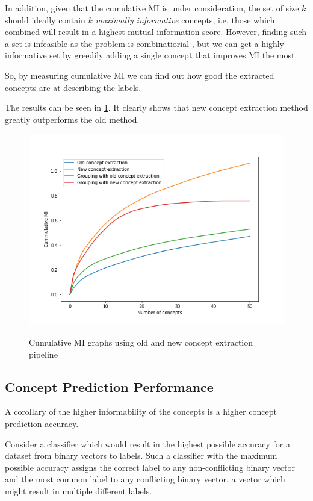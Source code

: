 In addition, given that the cumulative MI is under consideration, the set of size $k$ should ideally contain $k$ \emph{maximally informative} concepts, i.e. those which combined will result in a highest mutual information score.
However, finding such a set is infeasible as the problem is combinatiorial \cite{RefWorks:RefID:16-2021automatic}, but we can get a highly informative set by greedily adding a single concept that improves MI the most. 

So, by measuring cumulative MI we can find out how good the extracted concepts are at describing the labels.

The results can be seen in \ref{cummulative-mi-graphs}.
It clearly shows that new concept extraction method greatly outperforms the old method.

\begin{figure}[h]
\caption{Cumulative MI graphs using old and new concept extraction pipeline}
\centering
\includegraphics[width=\textwidth]{evaluation/Cummulative MI graphs.png}
\label{cummulative-mi-graphs}
\end{figure}


\subsection{Concept Prediction Performance}

A corollary of the higher informability of the concepts is a higher concept prediction accuracy.

Consider a classifier which would result in the highest possible accuracy for a dataset from binary vectors to labels.
Such a classifier with the maximum possible accuracy assigns the correct label to any non-conflicting binary vector and the most common label to any conflicting binary vector, a vector which might result in multiple different labels.

